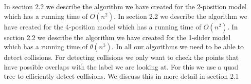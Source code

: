 \documentclass[crop=false,a4paper,oneside,11pt]{standalone}
\begin{document}
In section 2.2 we describe the algorithm we have created for the 2-position model which has a running time of $O(n^2)$. In section 2.2 we describe the algorithm we have created for the 4-position model which has a running time of $O(n^2)$. In section 2.2 we describe the algorithm we have created for the 1-slider model which has a running time of $\theta(n^3)$. In all our algorithms we need to be able to detect collisions. For detecting collisions we only want to check the points that have possible overlaps with the label we are looking at. For this we use a quad tree to efficiently detect collisions. We discuss this in more detail in section 2.1
\end{document}

